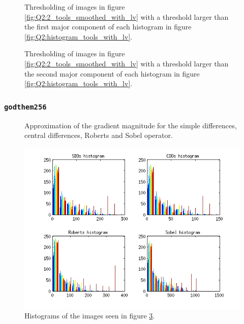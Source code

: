 \begin{figure}[H]
	\centering
	\scalebox{0.9}{}
	\caption{Thresholding of images in figure \ref{fig:Q2:2_tools_smoothed_with_lv} with a threshold larger than the first major component of
	each histogram in figure \ref{fig:Q2:histogram_tools_with_lv}.}
	\label{fig:Q2:threshold_tools_smoothed_1_with_lv}
\end{figure}

\begin{figure}[H]
	\centering
	\scalebox{0.9}{}
	\caption{Thresholding of images in figure \ref{fig:Q2:2_tools_smoothed_with_lv} with a threshold larger than the second major component of
	each histogram in figure \ref{fig:Q2:histogram_tools_with_lv}.}
	\label{fig:Q2:threshold_tools_smoothed_2_with_lv}
\end{figure}




\subsubsection{\texttt{godthem256}}

\begin{figure}[H]
	\centering
	\scalebox{0.7}{}
	\caption{Approximation of the gradient magnitude for the simple differences, central differences, Roberts and Sobel operator.}
	\label{fig:Q2:2_house_with_lv}
\end{figure}

\begin{figure}[H]
	\centering
	\includegraphics[scale=0.8]{./images/Q2/with_lv/house/histogram_2.png}
	\caption{Histograms of the images seen in figure \ref{fig:Q2:2_house_with_lv}.}
	\label{fig:Q2:histogram_house_with_lv}
\end{figure}


